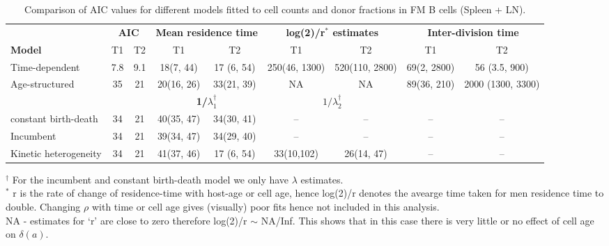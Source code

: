 \documentclass[11.5pt]{article}
\begin{document}
\begin{table}[h!]
	\begin{center}
		\renewcommand{\arraystretch}{1.25}
		\begin{tabular}{ l | c c | c c | c c | c c } 
			\toprule 
			& \multicolumn{2}{c|}{\textbf{AIC}} & \multicolumn{2}{c|}{\textbf{Mean residence time}}  & \multicolumn{2}{c|}{\textbf{log(2)/r$^\ast$ estimates}}  & \multicolumn{2}{c}{\textbf{Inter-division time}} \\
			\cline{2-9}
			\textbf{Model}  &  {\small T1}  &  {\small T2} & {\small T1} & {\small T2} &  {\small T1}  &  {\small T2} & {\small T1} & {\small T2} \\ 
			\toprule
			Time-dependent            & 7.8   &  9.1 & 18(7, 44) & 17 (6, 54) & 250(46, 1300)  & 520(110, 2800) & 69(2, 2800) & 56 (3.5, 900)\\ 
			Age-structured            & 35   &  21 &  20(16, 26) & 33(21, 39) & NA  & NA &  89(36, 210) & 2000 (1300, 3300) \\ 
			\cline{4-9} 
			& \multicolumn{2}{c|}{\textbf{}} & \multicolumn{2}{c|}{\textbf{1/$\lambda_1^{\dagger}$ }}  & \multicolumn{2}{c|}{\textbf{$1/\lambda_2^{\dagger}$}} & \multicolumn{2}{c}{\textbf{}} \\
			\cline{4-9}
			constant birth-death       & 34  &  21 & 40(35, 47) & 34(30, 41) & -- & -- & -- & -- \\ 
			Incumbent                 & 34   &  21 & 39(34, 47) & 34(29, 40) & --  & -- & -- & -- \\ 
			Kinetic heterogeneity     & 34   &  21 & 41(37, 46) & 17 (6, 54) & 33(10,102) & 26(14, 47)  & -- & -- \\ 
			\hline
			\toprule 
		\end{tabular}
	\end{center}
	\caption{\small Comparison of AIC values for different models fitted to cell counts and donor fractions in FM B cells (Spleen + LN).}
	$^{\dagger}$ \footnotesize For the incumbent and constant birth-death model we only have $\lambda$ estimates. \\
	$^\ast$ \footnotesize r is the rate of change of residence-time with host-age or cell age, hence log(2)/r denotes the avearge time taken for men residence time to double. Changing $\rho$ with time or cell age gives (visually) poor fits hence not included in this analysis. \\
	\footnotesize NA - estimates for `r' are close to zero therefore log(2)/r $\sim$ NA/Inf. This shows that in this case there is very little or no effect of cell age on $\delta(a)$.
\label{tab:FMs}
\end{table} 
\end{document}
